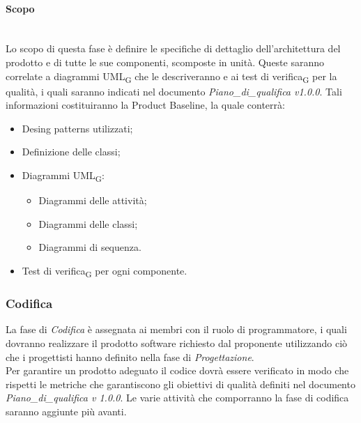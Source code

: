 	\paragraph {Scopo}\mbox{}\\
	Lo scopo di questa fase è definire le specifiche di dettaglio dell’architettura del prodotto e di tutte le sue componenti, scomposte in unità. Queste saranno correlate a diagrammi UML\textsubscript{G} che le descriveranno e ai test di verifica\textsubscript{G} per la qualità, i quali saranno indicati nel documento \textit{Piano\_di\_qualifica v1.0.0}. Tali informazioni costituiranno la Product Baseline, la quale conterrà:
	\begin{itemize}
		\item Desing patterns utilizzati;
		\item Definizione delle classi;
		\item Diagrammi UML\textsubscript{G}:
		\begin{itemize}
			\item Diagrammi delle attività;
			\item Diagrammi delle classi;
			\item Diagrammi di sequenza.
		\end{itemize}
		\item Test di verifica\textsubscript{G} per ogni componente.
	\end{itemize}
	\subsubsection{Codifica}
	La fase di \textit{Codifica} è assegnata ai membri con il ruolo di programmatore, i quali dovranno realizzare il prodotto software richiesto dal proponente utilizzando ciò che i progettisti hanno definito nella fase di \textit{Progettazione}.\\
	Per garantire un prodotto adeguato il codice dovrà essere verificato in modo che rispetti le metriche che garantiscono gli obiettivi di qualità definiti nel documento \textit{Piano\_di\_qualifica v 1.0.0}.
	Le varie attività che comporranno la fase di codifica saranno aggiunte più avanti. 

    
    
